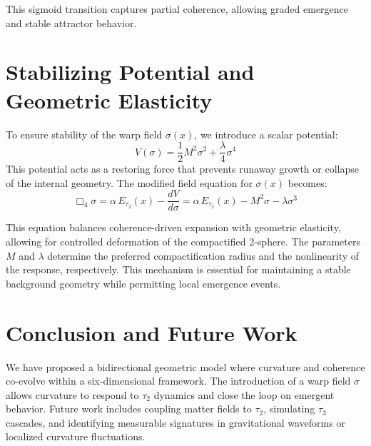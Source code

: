 \documentclass[12pt]{article}
\begin{document}
This sigmoid transition captures partial coherence, allowing graded emergence and stable attractor behavior.



\section*{Stabilizing Potential and Geometric Elasticity}

To ensure stability of the warp field \(\sigma(x)\), we introduce a scalar potential:
\[
V(\sigma) = \frac{1}{2} M^2 \sigma^2 + \frac{\lambda}{4} \sigma^4
\]
This potential acts as a restoring force that prevents runaway growth or collapse of the internal geometry. The modified field equation for \(\sigma(x)\) becomes:
\[
\Box_4 \sigma = \alpha \, E_{\tau_2}(x) - \frac{dV}{d\sigma} = \alpha \, E_{\tau_2}(x) - M^2 \sigma - \lambda \sigma^3
\]

This equation balances coherence-driven expansion with geometric elasticity, allowing for controlled deformation of the compactified 2-sphere. The parameters \(M\) and \(\lambda\) determine the preferred compactification radius and the nonlinearity of the response, respectively. This mechanism is essential for maintaining a stable background geometry while permitting local emergence events.

\section{Conclusion and Future Work}
We have proposed a bidirectional geometric model where curvature and coherence co-evolve within a six-dimensional framework. The introduction of a warp field \( \sigma \) allows curvature to respond to \( \tau_2 \) dynamics and close the loop on emergent behavior. Future work includes coupling matter fields to \( \tau_2 \), simulating \( \tau_3 \) cascades, and identifying measurable signatures in gravitational waveforms or localized curvature fluctuations.
\end{document}
